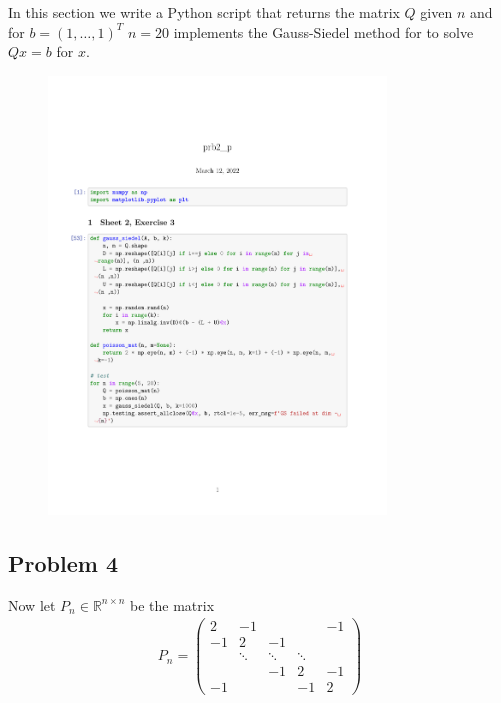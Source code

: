 \subsubsection{}
In this section we write a Python script that returns the matrix $Q$ given
$n$ and for $b = (1, \ldots ,1)^T$ $n=20$ implements the Gauss-Siedel method
for to solve $Qx = b$ for $x$.
%
\begin{figure}[htpb]
    \centering
    \includegraphics[width=0.8\textwidth, clip, trim=0cm 5cm 0cm 10cm]{./prog/prb2_p.pdf}
\end{figure}
\subsection{Problem 4}
Now let $P_n \in \mathbb{R}^{n\times n}$ be the matrix
\begin{align}
    P_n =
    \begin{pmatrix}
        2 & -1 &   &  & -1  \\
        -1& 2  & -1&  &   \\
          & \ddots  & \ddots & \ddots &   \\
          &   & -1 &  2 & -1\\
        -1 &   &  &  -1 & 2
    \end{pmatrix}
\end{align}
